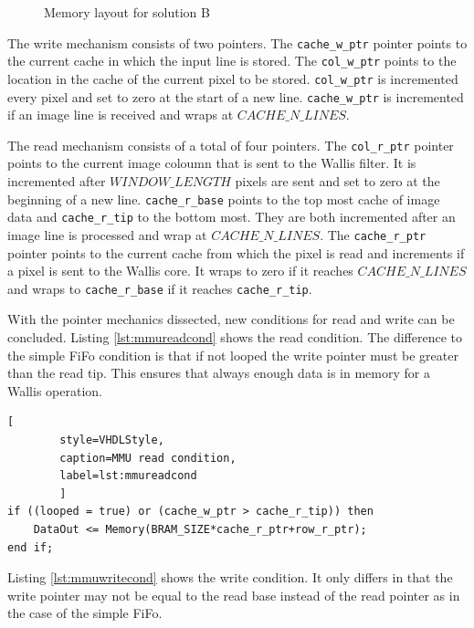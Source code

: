 \begin{figure}[tb!]
    \centering
    \begin{adjustbox}{max width=0.95\textwidth}
        
    \end{adjustbox}
    \caption{Memory layout for solution B}
    \label{fig:solbmemlayout}
\end{figure}

The write mechanism consists of two pointers. The \texttt{cache\_w\_ptr} pointer
points to the current cache in which the input line is stored. The 
\texttt{col\_w\_ptr} points to the location in the cache of the current pixel to
be stored. \texttt{col\_w\_ptr} is incremented every pixel and set to zero at
the start of a new line. \texttt{cache\_w\_ptr} is incremented if an image line
is received and wraps at $CACHE\_N\_LINES$.

The read mechanism consists of a total of four pointers. The \texttt{col\_r\_ptr}
pointer points to the current image coloumn that is sent to the Wallis filter.
It is incremented after $WINDOW\_LENGTH$ pixels are sent and set to zero at
the beginning of a new line. \texttt{cache\_r\_base} points to the top most
cache of image
data and \texttt{cache\_r\_tip} to the bottom most. They are both incremented
after an image line is processed and wrap at $CACHE\_N\_LINES$. The 
\texttt{cache\_r\_ptr} pointer points to the current cache from which the pixel
is read and increments if a pixel is sent to the Wallis core. It wraps to zero
if it reaches $CACHE\_N\_LINES$ and wraps to \texttt{cache\_r\_base} if it
reaches \texttt{cache\_r\_tip}. 

With the pointer mechanics dissected, new conditions for read and write can be
concluded. Listing \ref{lst:mmureadcond} shows the read condition. The
difference to the simple FiFo condition is that if not looped the write pointer
must be greater than the read tip. This ensures that always enough data is in
memory for a Wallis operation.

\begin{minipage}{\linewidth}
    \begin{lstlisting}[
        style=VHDLStyle, 
        caption=MMU read condition, 
        label=lst:mmureadcond
        ]
if ((looped = true) or (cache_w_ptr > cache_r_tip)) then
    DataOut <= Memory(BRAM_SIZE*cache_r_ptr+row_r_ptr);
end if;\end{lstlisting}
\end{minipage}

Listing \ref{lst:mmuwritecond} shows the write condition. It only differs in
that the write pointer may not be equal to the read base instead of the read
pointer as in the case of the simple FiFo.

